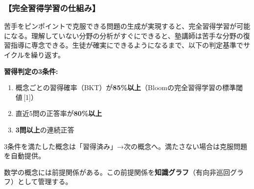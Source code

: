 \documentclass[paper=a4,fontsize=10.5bp,jafontsize=10.5bp,twocolumn]{jlreq}
\begin{document}
\subsubsection{【完全習得学習の仕組み】}

苦手をピンポイントで克服できる問題の生成が実現すると、完全習得学習が可能になる。理解していない分野の分析がすぐにできると、塾講師は苦手な分野の復習指導に専念できる。生徒が確実にできるようになるまで、以下の判定基準でサイクルを繰り返す。

\begin{graybox}
\textbf{習得判定の3条件:}
\begin{enumerate}[leftmargin=2em]
  \item 概念ごとの習得確率（BKT）が\textbf{85\%以上}（Bloomの完全習得学習の標準閾値\,[1]）
  \item 直近5問の正答率が\textbf{80\%以上}
  \item \textbf{3問以上}の連続正答
\end{enumerate}
3条件を満たした概念は「習得済み」→次の概念へ。満たさない場合は克服問題を自動提供。
\end{graybox}

数学の概念には前提関係がある。この前提関係を\textbf{知識グラフ}（有向非巡回グラフ）として管理する。
\end{document}
